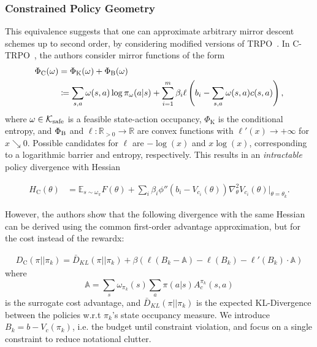 \documentclass{article}
\theoremstyle{plain}
\theoremstyle{definition}
\theoremstyle{remark}
\newcommand{\C}{\mathrm{C}}
\begin{document}
\subsubsection{Constrained Policy Geometry}
This equivalence suggests that one can approximate arbitrary mirror descent schemes up to second order, by considering modified versions of TRPO~\citep{schulman2017trust}. 
In C-TRPO~\citep{milosevic2024embedding}, the authors consider mirror functions of the form
\begin{align}
    \Phi_{\operatorname{C}}(\omega) &=\Phi_\textup{K}(\omega) + \Phi_\textup{B}(\omega)\\
                               &\coloneqq\sum_{s,a}\omega(s,a)\log\pi_\omega(a|s)  + \sum_{i=1}^m \beta_i \ell\left(b_i-\sum_{s,a}\omega(s,a)c(s,a)\right), 
\end{align}
where $\omega\in\mathcal{K}_\textup{safe}$ is a feasible state-action occupancy, $\Phi_{\operatorname{K}}$ is the conditional entropy, and $\Phi_\textup{B}$ and $\ell\colon\mathbb R_{>0}\to\mathbb R$ are convex functions with $\ell'(x)\to+\infty$ for $x\searrow0$. 
Possible candidates for $\ell$ are $-\log(x)$ and $x\log(x)$, corresponding to a logarithmic barrier and entropy, respectively. 
This results in an \emph{intractable} policy divergence with Hessian

\begin{align*}
    H_\C(\theta) & = \mathbb{E}_{s\sim \omega_\pi}F(\theta) + \sum_i \beta_i \phi''(b_i-V_{c_i}(\theta)) \nabla_\theta^2 V_{c_i}(\theta) \Big|_{\theta = \theta_k}.
\end{align*}

However, the authors show that the following divergence with the same Hessian can be derived using the common first-order advantage approximation, but for the cost instead of the rewardx:

\begin{align}
    D_\C(\pi||\pi_k) = \bar D_{KL}(\pi||\pi_k) + \beta (\ell(B_k-\mathbb{ A}) - \ell(B_k) - \ell'(B_k)\cdot\mathbb{ A})
\end{align}
where $$\mathbb{A} = \sum_s\omega_{\pi_k}(s)\sum_a \pi(a|s) A^{\pi_k}_c(s,a)$$ is the surrogate cost advantage, and $\bar D_{KL}(\pi||\pi_k)$ is the expected KL-Divergence between the policies w.r.t $\pi_k$'s state occupancy measure. We introduce $B_k = b - V_c(\pi_k)$, i.e. the budget until constraint violation, and focus on a single constraint to reduce notational clutter.
\end{document}
